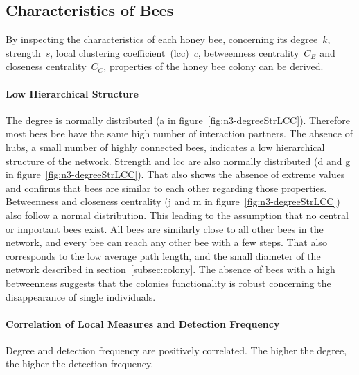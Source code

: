 \subsection{Characteristics of Bees}
By inspecting the characteristics of each honey bee, concerning its degree~$k$, strength~$s$, local clustering coefficient~(lcc)~$c$, betweenness centrality~$C_B$ and closeness centrality~$C_C$, properties of the honey bee colony can be derived.



\paragraph{Low Hierarchical Structure}
The degree is normally distributed (a in figure~\ref{fig:n3-degreeStrLCC}).
Therefore most bees bee have the same high number of interaction partners.
The absence of hubs, a small number of highly connected bees, indicates a low hierarchical structure of the network.
Strength and lcc are also normally distributed (d and g in figure~\ref{fig:n3-degreeStrLCC}).
That also shows the absence of extreme values and confirms that bees are similar to each other regarding those properties.
Betweenness and closeness centrality (j and m in figure~\ref{fig:n3-degreeStrLCC}) also follow a normal distribution.
This leading to the assumption that no central or important bees exist.
All bees are similarly close to all other bees in the network, and every bee can reach any other bee with a few steps.
That also corresponds to the low average path length, and the small diameter of the network described in section~\ref{subsec:colony}.
The absence of bees with a high betweenness suggests that the colonies functionality is robust concerning the disappearance of single individuals.

\paragraph{Correlation of Local Measures and Detection Frequency}
Degree and detection frequency are positively correlated.
The higher the degree, the higher the detection frequency.


